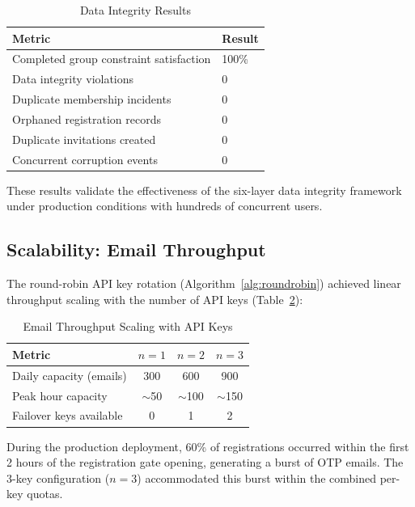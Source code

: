 \documentclass[11pt,a4paper]{article}
\theoremstyle{plain}
\theoremstyle{definition}
\begin{document}
\begin{table}[htbp]
\centering
\caption{Data Integrity Results}
\label{tab:integrity_results}
\small
\renewcommand{\arraystretch}{1.15}
\begin{tabular}{@{}ll@{}}
\toprule
\textbf{Metric} & \textbf{Result} \\
\midrule
Completed group constraint satisfaction & 100\% \\
Data integrity violations & 0 \\
Duplicate membership incidents & 0 \\
Orphaned registration records & 0 \\
Duplicate invitations created & 0 \\
Concurrent corruption events & 0 \\
\bottomrule
\end{tabular}
\end{table}

These results validate the effectiveness of the six-layer data integrity framework under production conditions with hundreds of concurrent users.

\subsection{Scalability: Email Throughput}

The round-robin API key rotation (Algorithm~\ref{alg:roundrobin}) achieved linear throughput scaling with the number of API keys (Table~\ref{tab:email_scaling}):

\begin{table}[htbp]
\centering
\caption{Email Throughput Scaling with API Keys}
\label{tab:email_scaling}
\small
\renewcommand{\arraystretch}{1.15}
\begin{tabular}{@{}lccc@{}}
\toprule
\textbf{Metric} & $n = 1$ & $n = 2$ & $n = 3$ \\
\midrule
Daily capacity (emails) & 300 & 600 & 900 \\
Peak hour capacity & $\sim$50 & $\sim$100 & $\sim$150 \\
Failover keys available & 0 & 1 & 2 \\
\bottomrule
\end{tabular}
\end{table}

During the production deployment, 60\% of registrations occurred within the first 2 hours of the registration gate opening, generating a burst of OTP emails. The 3-key configuration ($n = 3$) accommodated this burst within the combined per-key quotas.
\end{document}
